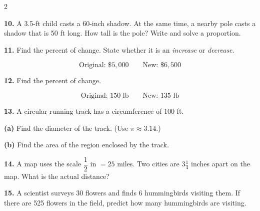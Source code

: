 \documentclass[11pt]{article}
\newcommand{\workspace}[1][3.5cm]{\vspace{#1}}
\begin{document}
\begin{multicols}{2}
\workspace[3cm]

\textbf{10.} \; A 3.5-ft child casts a 60-inch shadow. At the same time,
a nearby pole casts a shadow that is 50 ft long. How tall is the pole?
Write and solve a proportion.

\workspace[4.5cm]

\textbf{11.} \; Find the percent of change. State whether it is an
\textit{increase} or \textit{decrease}.

\[
  \text{Original: } \$5{,}000 \qquad \text{New: } \$6{,}500
\]

\workspace[3.5cm]

\textbf{12.} \; Find the percent of change.

\[
  \text{Original: } 150 \text{ lb} \qquad \text{New: } 135 \text{ lb}
\]

\workspace[3.5cm]

\textbf{13.} \; A circular running track has a circumference of 100 ft.

\textbf{(a)} Find the diameter of the track. (Use $\pi \approx 3.14$.)

\workspace[3cm]

\textbf{(b)} Find the area of the region enclosed by the track.

\workspace[3cm]

\textbf{14.} \; A map uses the scale $\dfrac{1}{2}$ in $= 25$ miles.
Two cities are $3\tfrac{1}{4}$ inches apart on the map.
What is the actual distance?

\workspace[3.5cm]

\textbf{15.} \; A scientist surveys 30 flowers and finds 6 hummingbirds
visiting them. If there are 525 flowers in the field, predict how many
hummingbirds are visiting.


\end{multicols}
\end{document}
